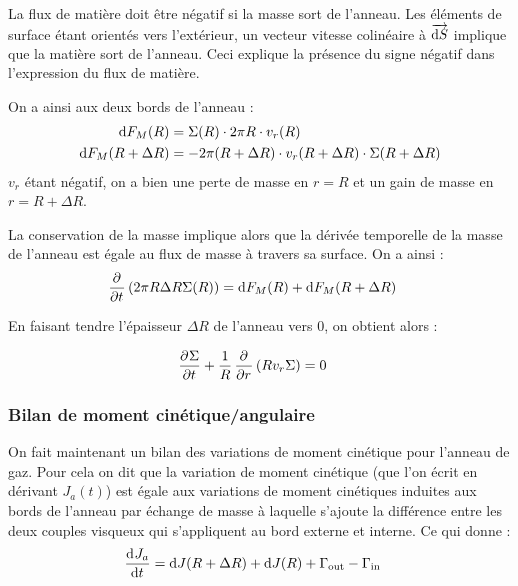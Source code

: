La flux de matière doit être négatif si la masse sort de l'anneau. Les éléments de surface étant orientés vers l'extérieur, un vecteur vitesse colinéaire à ${\overrightarrow{\operatorname{d \!} S}}$ implique que la matière sort de l'anneau. Ceci explique la présence du signe négatif dans l'expression du flux de matière.

On a ainsi aux deux bords de l'anneau :
\begin{subequations}
\begin{align}
\operatorname{d \!} F_M(R) &= \Sigma(R) \cdot 2\pi R \cdot v_r(R)\\
\operatorname{d \!} F_M(R+\Delta R) &= - 2\pi (R+\Delta R) \cdot v_r(R+\Delta R) \cdot \Sigma(R+\Delta R)
\end{align}\label{eq:dif_F_M}
\end{subequations}
$v_r$ étant négatif, on a bien une perte de masse en $r=R$ et un gain de masse en $r=R+\Delta R$.

La conservation de la masse implique alors que la dérivée temporelle de la masse de l'anneau est égale au flux de masse à travers sa surface. On a ainsi : 
\begin{align*}
\mathinner{ \dfrac{\partial{^{}}}{\partial{{t}^{}}} }\left(2\pi R \Delta R \Sigma(R)\right) &= \operatorname{d \!} F_M(R) + \operatorname{d \!} F_M(R+\Delta R)
\end{align*}

En faisant tendre l'épaisseur $\Delta R$ de l'anneau vers 0, on obtient alors :
\begin{important}
\begin{align}
\mathinner{ \dfrac{\partial{^{}}\Sigma}{\partial{{t}^{}}} } + \frac{1}{R}\mathinner{ \dfrac{\partial{^{}}}{\partial{{r}^{}}} }\left(R v_r \Sigma\right)&=0\label{eq:conservation_masse}
\end{align}
\end{important}

\subsubsection{Bilan de moment cinétique/angulaire}
On fait maintenant un bilan des variations de moment cinétique pour l'anneau de gaz. Pour cela on dit que la variation de moment cinétique (que l'on écrit en dérivant $J_a(t)$) est égale aux variations de moment cinétiques induites aux bords de l'anneau par échange de masse à laquelle s'ajoute la différence entre les deux couples visqueux qui s'appliquent au bord externe et interne. Ce qui donne : 
\begin{align}
\mathinner{ \dfrac{\operatorname{d \!}{^{}}J_a}{\operatorname{d \!}{{t}^{}}} } &= \operatorname{d \!} J(R+\Delta R) + \operatorname{d \!} J(R) + \Gamma_\text{out} - \Gamma_\text{in}\label{eq:cons_J_a}
\end{align}

